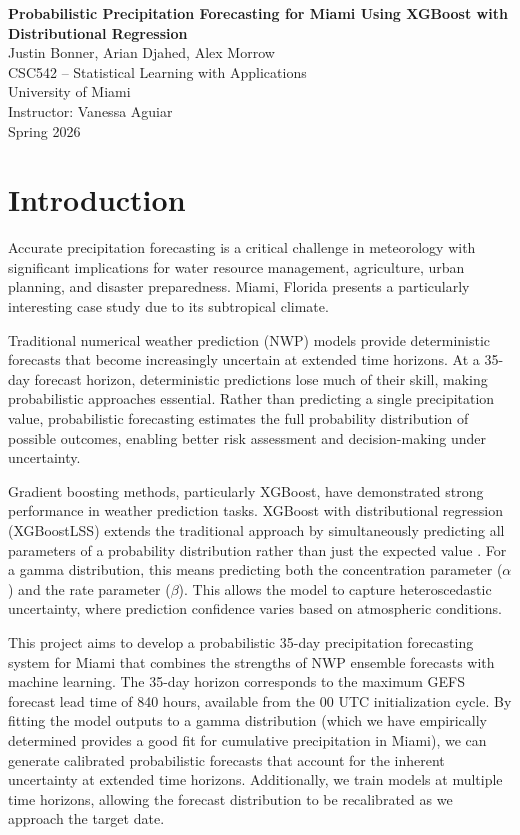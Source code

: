 \documentclass[11pt]{article}
\begin{document}
\begin{center}
    {\LARGE \textbf{Probabilistic Precipitation Forecasting for Miami Using XGBoost with Distributional Regression}}\\[1.5em]
    {\large Justin Bonner, Arian Djahed, Alex Morrow}\\[0.5em]
    CSC542 -- Statistical Learning with Applications\\
    University of Miami\\
    Instructor: Vanessa Aguiar\\[0.5em]
    Spring 2026
\end{center}
\vspace{1em}

\section{Introduction}
Accurate precipitation forecasting is a critical challenge in meteorology with significant implications for water resource management, agriculture, urban planning, and disaster preparedness. Miami, Florida presents a particularly interesting case study due to its subtropical climate.

Traditional numerical weather prediction (NWP) models provide deterministic forecasts that become increasingly uncertain at extended time horizons. At a 35-day forecast horizon, deterministic predictions lose much of their skill, making probabilistic approaches essential. Rather than predicting a single precipitation value, probabilistic forecasting estimates the full probability distribution of possible outcomes, enabling better risk assessment and decision-making under uncertainty.

Gradient boosting methods, particularly XGBoost, have demonstrated strong performance in weather prediction tasks. XGBoost with distributional regression (XGBoostLSS) extends the traditional approach by simultaneously predicting all parameters of a probability distribution rather than just the expected value \citep{marz2019xgboostlss}. For a gamma distribution, this means predicting both the concentration parameter ($\alpha$) and the rate parameter ($\beta$). This allows the model to capture heteroscedastic uncertainty, where prediction confidence varies based on atmospheric conditions.

This project aims to develop a probabilistic 35-day precipitation forecasting system for Miami that combines the strengths of NWP ensemble forecasts with machine learning. The 35-day horizon corresponds to the maximum GEFS forecast lead time of 840 hours, available from the 00 UTC initialization cycle. By fitting the model outputs to a gamma distribution (which we have empirically determined provides a good fit for cumulative precipitation in Miami), we can generate calibrated probabilistic forecasts that account for the inherent uncertainty at extended time horizons. Additionally, we train models at multiple time horizons, allowing the forecast distribution to be recalibrated as we approach the target date.
\end{document}
